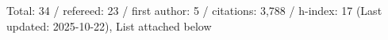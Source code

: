 Total: 34 / refereed: 23 / first author: 5 / citations: 3,788 / h-index: 17 (Last updated: 2025-10-22), List attached below
